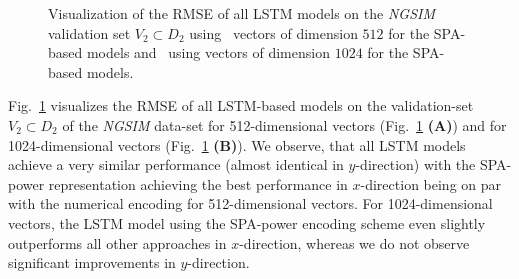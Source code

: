 \begin{figure}[t!]
{    }
    \vspace{-0.3cm}

    \caption{Visualization of the \ac{RMSE} of all \ac{LSTM} models on the \emph{\ac{NGSIM}} validation set $V_2 \subset D_2$ using~\protect{} vectors of dimension $512$ for the \ac{SPA}-based models and~\protect{} using vectors of dimension $1024$ for the \ac{SPA}-based models.}\label{fig:rmse_ngsim_all}

\end{figure}

Fig.~\ref{fig:rmse_ngsim_all} visualizes the \ac{RMSE} of all \ac{LSTM}-based models on the validation-set $V_2 \subset D_2$ of the \emph{\ac{NGSIM}} data-set for \num{512}-dimensional vectors (Fig.~\ref{fig:rmse_ngsim_all} \textbf{(A)}) and for \num{1024}-dimensional vectors (Fig.~\ref{fig:rmse_ngsim_all} \textbf{(B)}).
We observe, that all \ac{LSTM} models achieve a very similar performance (almost identical in $y$-direction) with the \ac{SPA}-power representation achieving the best performance in $x$-direction being on par with the numerical encoding for \num{512}-dimensional vectors.
For \num{1024}-dimensional vectors, the \ac{LSTM} model using the \ac{SPA}-power encoding scheme even slightly outperforms all other approaches in $x$-direction, whereas we do not observe significant improvements in $y$-direction.


